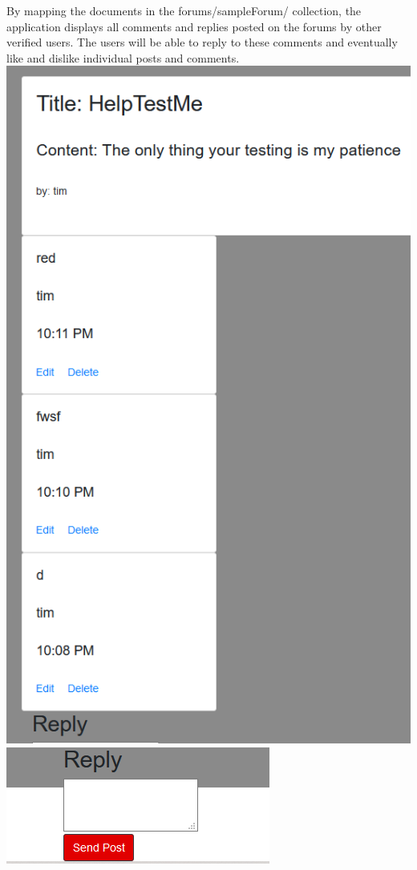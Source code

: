 By mapping the documents in the forums/sampleForum/ collection, the application displays all comments and replies posted on the forums by other verified users. The users will be able to reply to these comments and eventually like and dislike individual posts and comments.\\
\includegraphics[scale=0.3]{./img/Post.png} 
\includegraphics[scale=0.3]{./img/Reply.png} \\

